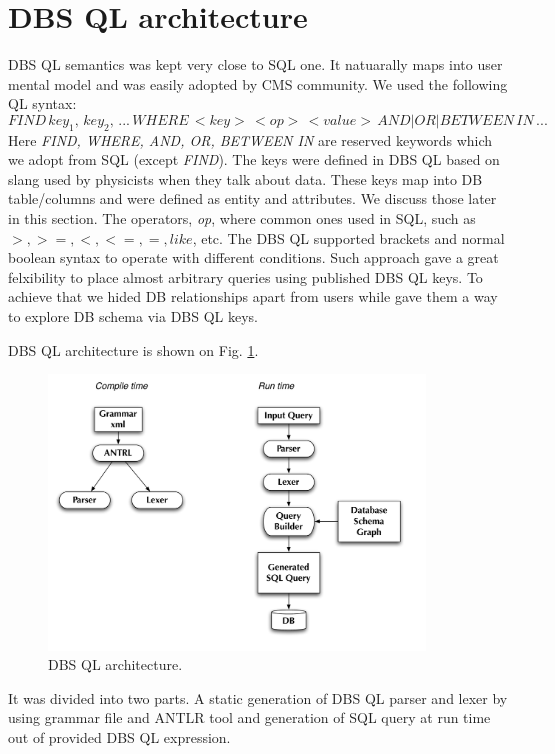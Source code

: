 \documentclass[a4paper]{jpconf}
\begin{document}
\section{DBS QL architecture}
DBS QL semantics was kept very close to SQL one. It natuarally
maps into user mental model and was easily adopted by CMS
community. We used the following QL syntax:
$$
FIND\,
key_1,\, key_2,\, ...\, WHERE\,
<key>\, <op>\, <value>\, AND|OR|BETWEEN\, IN\, ...
$$
Here {\it FIND, WHERE, AND, OR, BETWEEN IN} are reserved keywords
which we adopt from SQL (except {\it FIND}). The keys were defined
in DBS QL based on slang used by physicists when they talk about
data. These keys map into DB table/columns and were defined
as entity and attributes. We discuss those later in this section.
The operators, {\it op}, where common ones used in SQL, such as
$>, >=, <, <=, =, like$, etc. The DBS QL supported brackets and
normal boolean syntax to operate with different conditions.
Such approach gave a great felxibility to place almost
arbitrary queries using published DBS QL keys. To achieve that
we hided DB relationships apart from users while gave them
a way to explore DB schema via DBS QL keys.

DBS QL architecture is shown on Fig. \ref{DBS_QL}.
\begin{figure}[htb]
\centering
\includegraphics[width=100mm]{DBS_QL_architecture.pdf}
\caption{DBS QL architecture.}
\label{DBS_QL}
\end{figure}
It was divided into two parts. A static generation of DBS QL
parser and lexer by using grammar file and ANTLR tool\cite{ANTLR}
and generation of SQL query at run time out of provided DBS QL expression.
\end{document}
